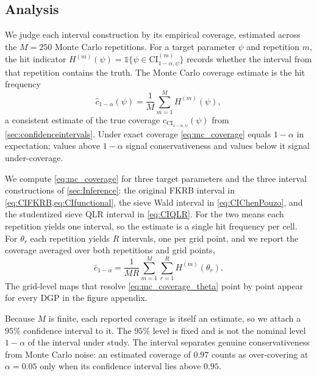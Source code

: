 \subsection{Analysis}
\label{sec:analysis}
We judge each interval construction by its empirical coverage, estimated across the $M = 250$ Monte Carlo repetitions.
For a target parameter $\psi$ and repetition $m$, the hit indicator $H^{(m)}(\psi) = \mathds{1}\{\psi \in \mathrm{CI}^{(m)}_{1-\alpha,\psi}\}$ records whether the interval from that repetition contains the truth.
The Monte Carlo coverage estimate is the hit frequency
\begin{equation}
\label{eq:mc_coverage}
    \hat{c}_{1-\alpha}(\psi) = \frac{1}{M}\sum_{m=1}^{M} H^{(m)}(\psi),
\end{equation}
a consistent estimate of the true coverage $c_{\mathrm{CI}_{1-\alpha,\psi}}(\psi)$ from \cref{sec:confidenceintervals}.
Under exact coverage \cref{eq:mc_coverage} equals $1-\alpha$ in expectation; values above $1-\alpha$ signal conservativeness and values below it signal under-coverage.

We compute \cref{eq:mc_coverage} for three target parameters and the three interval constructions of \cref{sec:Inference}: the original FKRB interval in \cref{eq:CIFKRB,eq:CIfunctional}, the sieve Wald interval in \cref{eq:CIChenPouzo}, and the studentized sieve QLR interval in \cref{eq:CIQLR}.
For the two means each repetition yields one interval, so the estimate is a single hit frequency per cell.
For $\theta_r$ each repetition yields $R$ intervals, one per grid point, and we report the coverage averaged over both repetitions and grid points,
\begin{equation}
\label{eq:mc_coverage_theta}
    \bar{c}_{1-\alpha} = \frac{1}{MR}\sum_{m=1}^{M}\sum_{r=1}^{R} H^{(m)}(\theta_r).
\end{equation}
The grid-level maps that resolve \cref{eq:mc_coverage_theta} point by point appear for every DGP in the figure appendix.

Because $M$ is finite, each reported coverage is itself an estimate, so we attach a $95\%$ confidence interval to it.
The $95\%$ level is fixed and is not the nominal level $1-\alpha$ of the interval under study.
The interval separates genuine conservativeness from Monte Carlo noise: an estimated coverage of $0.97$ counts as over-covering at $\alpha = 0.05$ only when its confidence interval lies above $0.95$.

